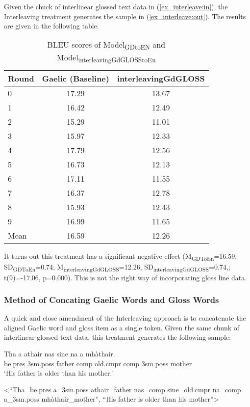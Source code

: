 \documentclass[final]{ua-thesis}
\numberwithin{equation}{section}
\begin{document}
Given the chuck of interlinear glossed text data in (\ref{ex_interleave:in}), the Interleaving treatment generates the sample in (\ref{ex_interleave:out}).  
The results are given in the following table. 
\begin{table}[ht]
\centering
\begin{tabular}{lcc}
  \hline
Round & Gaelic (Baseline) & interleavingGdGLOSS \\ 
  \hline
0 & 17.29 & 13.67 \\ 
  1 & 16.42 & 12.49 \\ 
  2 & 15.29 & 11.01 \\ 
  3 & 15.97 & 12.33 \\ 
  4 & 17.79 & 12.56 \\ 
  5 & 16.73 & 12.13 \\ 
  6 & 17.11 & 11.55 \\ 
  7 & 16.37 & 12.78 \\ 
  8 & 15.93 & 12.43 \\ 
  9 & 16.99 & 11.65 \\ 
   \hline
Mean & 16.59 & 12.26 \\ 
   \hline
\end{tabular}
\caption{BLEU scores of Model\textsubscript{GDtoEN} and Model\textsubscript{interleavingGdGLOSStoEn}} 
\label{Table:interleavingGdGLOSS}
\end{table}\newline
It turns out this treatment has a significant negative effect
(M\textsubscript{GDToEn}=16.59, SD\textsubscript{GDToEn}=0.74; M\textsubscript{interleavingGdGLOSS}=12.26, SD\textsubscript{interleavingGdGLOSS}=0.74,; t(9)=-17.06, p=0.000). This is not the right way of incorporating gloss line data. 


\subsubsection{Method of Concating Gaelic Words and Gloss Words }\label{treatment:Concating}
A quick and close amendment of the Interleaving approach is to concatenate the aligned Gaelic word and gloss item as a single token. Given the same chunk of interlinear glossed text data, this treatment generates the following sample:

\begin{exe} 
\ex 
	\begin{xlist}
	\ex 
		\gll	 Tha a athair nas sine na a mh\`athair.\\  
     		     be.pres 3sm.poss father comp old.cmpr comp 3sm.poss mother \\
    	\glt    `His father is older than his mother.'  

    \ex <``Tha\_be.pres a\_3sm.poss athair\_father nas\_comp sine\_old.cmpr na\_comp a\_3sm.poss mh\`athair\_mother'', ``His father is older than his mother''>
    \end{xlist}
\end{exe}
\end{document}
